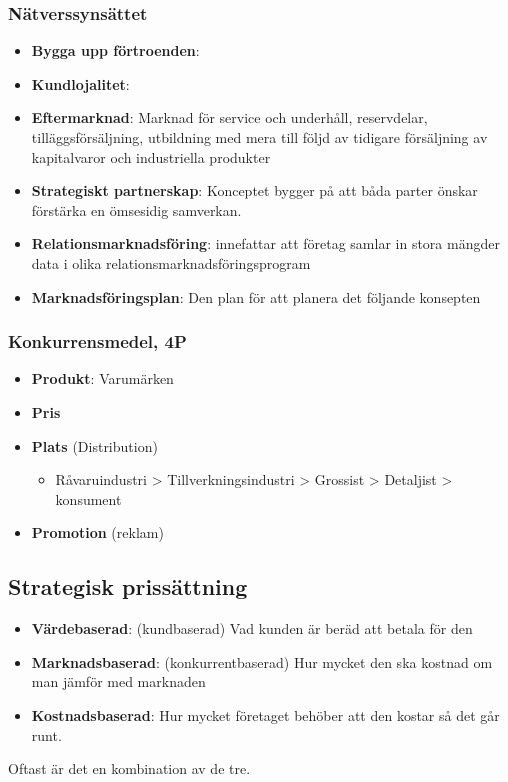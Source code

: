 \documentclass{article}
\begin{document}
\subsubsection{Nätverssynsättet}
\begin{itemize}
    \item \textbf{Bygga upp förtroenden}:
    \item \textbf{Kundlojalitet}:
    \item \textbf{Eftermarknad}: \newline
    Marknad för service och underhåll, reservdelar, tilläggsförsäljning, utbildning 
    med mera till följd av tidigare försäljning av kapitalvaror och industriella produkter
    \item \textbf{Strategiskt partnerskap}: \newline
    Konceptet bygger på att båda parter önskar förstärka en ömsesidig samverkan.
    \item \textbf{Relationsmarknadsföring}: \newline
    innefattar att företag samlar in stora mängder data i olika 
    relationsmarknadsföringsprogram
    \item \textbf{Marknadsföringsplan}: \newline
    Den plan för att planera det följande konsepten
\end{itemize}

\subsubsection{Konkurrensmedel, 4P}
\begin{itemize}
    \item \textbf{Produkt}: Varumärken
    \item \textbf{Pris} 
    \item \textbf{Plats} (Distribution)
    \begin{itemize}
        \item Råvaruindustri > Tillverkningsindustri > Grossist > Detaljist > konsument
    \end{itemize}
    \item \textbf{Promotion} (reklam)
\end{itemize}

\subsection{Strategisk prissättning}
\begin{itemize}
    \item \textbf{Värdebaserad}: (kundbaserad) \newline
    Vad kunden är beräd att betala för den
    \item \textbf{Marknadsbaserad}: (konkurrentbaserad) \newline
    Hur mycket den ska kostnad om man jämför med marknaden
    \item \textbf{Kostnadsbaserad}: \newline
    Hur mycket företaget behöber att den kostar så det går runt.
\end{itemize}
Oftast är det en kombination av de tre.
\end{document}
